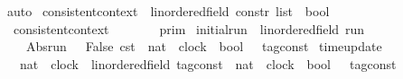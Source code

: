 \begin{isabellebody}
%
\isadelimproof
%
\endisadelimproof
%
\isatagproof
{}\isamarkupfalse%
\ auto%
\endisatagproof
{\isafoldproof}%
%
\isadelimproof
\isanewline
%
\endisadelimproof
\isanewline
{}\isamarkupfalse%
\ consistent{\isacharunderscore}context\ {\isacharcolon}{\isacharcolon}\ {\isacartoucheopen}{\isacharparenleft}{\isacharprime}{\isasymtau}{\isacharcolon}{\isacharcolon}linordered{\isacharunderscore}field{\isacharparenright}\ constr\ list\ {\isasymRightarrow}\ bool{\isacartoucheclose}\isanewline
{}\ \isanewline
\ \ {\isacartoucheopen}consistent{\isacharunderscore}context\ {\isasymGamma}\ {\isasymequiv}\ {\isasymexists}{\isasymrho}{\isachardot}\ {\isasymrho}\ {\isasymin}\ {\isasymlbrakk}{\isasymlbrakk}\ {\isasymGamma}\ {\isasymrbrakk}{\isasymrbrakk}\isactrlsub p\isactrlsub r\isactrlsub i\isactrlsub m{\isacartoucheclose}%
\isadelimdocument
%
\endisadelimdocument
%
\isatagdocument
%
\isamarkuptrue%
%
%
\endisatagdocument
{\isafolddocument}%
%
\isadelimdocument
%
\endisadelimdocument
\isanewline
{}\isamarkupfalse%
\ initial{\isacharunderscore}run\ {\isacharcolon}{\isacharcolon}\ {\isacartoucheopen}{\isacharparenleft}{\isacharprime}{\isasymtau}{\isacharcolon}{\isacharcolon}linordered{\isacharunderscore}field{\isacharparenright}\ run{\isacartoucheclose}\ {\isacharparenleft}{\isachardoublequoteopen}{\isasymrho}\isactrlsub {\isasymodot}{\isachardoublequoteclose}{\isacharparenright}\ \isanewline
\ \ {\isacartoucheopen}{\isasymrho}\isactrlsub {\isasymodot}\ {\isasymequiv}\ Abs{\isacharunderscore}run\ {\isacharparenleft}{\isacharparenleft}{\isasymlambda}{\isacharunderscore}\ {\isacharunderscore}{\isachardot}\ {\isacharparenleft}False{\isacharcomma}\ {\isasymtau}\isactrlsub c\isactrlsub s\isactrlsub t\ {}{\isacharparenright}{\isacharparenright}\ {\isacharcolon}{\isacharcolon}nat\ {\isasymRightarrow}\ clock\ {\isasymRightarrow}\ {\isacharparenleft}bool\ {\isasymtimes}\ {\isacharprime}{\isasymtau}\ tag{\isacharunderscore}const{\isacharparenright}{\isacharparenright}{\isacartoucheclose}\isanewline
\isanewline
%
\isanewline
{}\isamarkupfalse%
\ time{\isacharunderscore}update\isanewline
\ \ {\isacharcolon}{\isacharcolon}\ {\isacartoucheopen}nat\ {\isasymRightarrow}\ clock\ {\isasymRightarrow}\ {\isacharparenleft}{\isacharprime}{\isasymtau}{\isacharcolon}{\isacharcolon}linordered{\isacharunderscore}field{\isacharparenright}\ tag{\isacharunderscore}const\ {\isasymRightarrow}\ {\isacharparenleft}nat\ {\isasymRightarrow}\ clock\ {\isasymRightarrow}\ {\isacharparenleft}bool\ {\isasymtimes}\ {\isacharprime}{\isasymtau}\ tag{\isacharunderscore}const{\isacharparenright}{\isacharparenright}\isanewline

\end{isabellebody}
